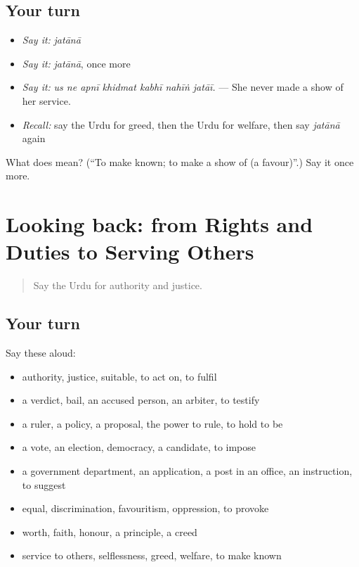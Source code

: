 \subsection*{Your turn}
\begin{itemize}
\raggedright
  \item \emph{Say it:} \emph{jatānā}
  \item \emph{Say it:} \emph{jatānā}, once more
  \item \emph{Say it:} \emph{us ne apnī khidmat kabhī nahīṅ jatāī.} — She never made a show of her service.
  \item \emph{Recall:} say the Urdu for greed, then the Urdu for welfare, then say \emph{jatānā} again
\end{itemize}

\begin{tcolorbox}[breakable,colback=teal!4,colframe=teal!35!black,title={Before you move on}]
What does  mean? (\textquotedblleft{}To make known; to make a show of (a favour)\textquotedblright{}.) Say it once more.
\end{tcolorbox}
\section[(dialogue)]{Looking back: from Rights and Duties to Serving Others}

\label{lesson:UR-R346-review-339-346}



\begin{quote}
Say the Urdu for authority and justice.
\end{quote}

\subsection*{Your turn}
Say these aloud:

\begin{itemize}
\raggedright
  \item authority, justice, suitable, to act on, to fulfil
  \item a verdict, bail, an accused person, an arbiter, to testify
  \item a ruler, a policy, a proposal, the power to rule, to hold to be
  \item a vote, an election, democracy, a candidate, to impose
  \item a government department, an application, a post in an office, an instruction, to suggest
  \item equal, discrimination, favouritism, oppression, to provoke
  \item worth, faith, honour, a principle, a creed
  \item service to others, selflessness, greed, welfare, to make known
\end{itemize}

